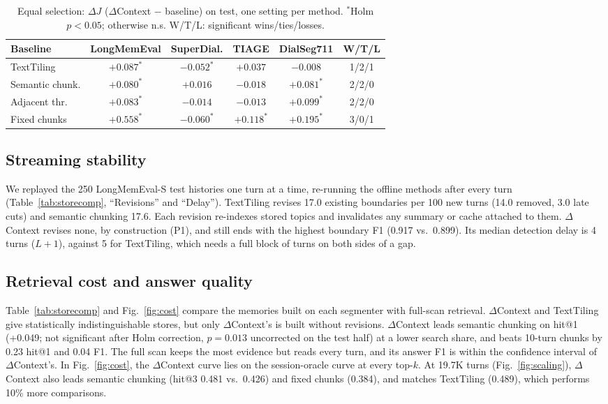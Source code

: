 \documentclass[journal]{IEEEtran}
\newcommand{\dc}{$\Delta$Context}
\begin{document}
\begin{table}[t]
\centering
\caption{Equal selection: $\Delta J$ (\dc{} $-$ baseline) on test, one setting per method. $^{*}$Holm $p<0.05$; otherwise n.s. W/T/L: significant wins/ties/losses.}
\label{tab:equal}
\footnotesize
\setlength{\tabcolsep}{2.4pt}
\begin{tabular}{@{}lccccc@{}}
\toprule
Baseline & LongMemEval & SuperDial. & TIAGE & DialSeg711 & W/T/L \\
\midrule
TextTiling & $+0.087^{*}$ & $-0.052^{*}$ & $+0.037$ & $-0.008$ & 1/2/1 \\
Semantic chunk. & $+0.080^{*}$ & $+0.016$ & $-0.018$ & $+0.081^{*}$ & 2/2/0 \\
Adjacent thr. & $+0.083^{*}$ & $-0.014$ & $-0.013$ & $+0.099^{*}$ & 2/2/0 \\
Fixed chunks & $+0.558^{*}$ & $-0.060^{*}$ & $+0.118^{*}$ & $+0.195^{*}$ & 3/0/1 \\
\bottomrule
\end{tabular}
\end{table}

\subsection{Streaming stability}
We replayed the 250 LongMemEval-S test histories one turn at a time, re-running
the offline methods after every turn (Table~\ref{tab:storecomp}, ``Revisions''
and ``Delay''). TextTiling revises 17.0 existing boundaries per 100 new turns
(14.0 removed, 3.0 late cuts) and semantic chunking 17.6. Each revision
re-indexes stored topics and invalidates any summary or cache attached to them.
\dc{} revises none, by construction (P1), and still ends with the highest
boundary F1 (0.917 vs.\ 0.899). Its median detection delay is 4 turns
($L{+}1$), against 5 for TextTiling, which needs a full block of turns on both
sides of a gap.

\subsection{Retrieval cost and answer quality}
Table~\ref{tab:storecomp} and Fig.~\ref{fig:cost} compare the memories built
on each segmenter with full-scan retrieval. \dc{} and TextTiling give
statistically indistinguishable stores, but only \dc{}'s is built without
revisions. \dc{} leads semantic chunking on hit@1 (+0.049; not significant
after Holm correction, $p=0.013$ uncorrected on the test half) at a lower
search share, and beats 10-turn chunks by 0.23 hit@1 and 0.04 F1. The full scan
keeps the most evidence but reads every turn, and its answer F1 is within the
confidence interval of \dc{}'s. In Fig.~\ref{fig:cost}, the \dc{} curve lies
on the session-oracle curve at every top-$k$. At 19.7K turns
(Fig.~\ref{fig:scaling}), \dc{} also leads semantic chunking (hit@3 0.481 vs.\
0.426) and fixed chunks (0.384), and matches TextTiling (0.489), which performs
10\% more comparisons.
\end{document}
